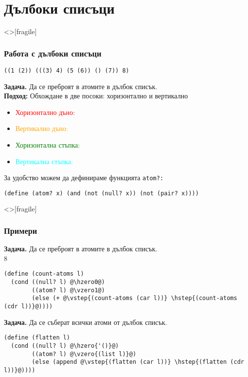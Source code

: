 \documentclass[alsotrans,beameroptions={aspectratio=169}]{beamerswitch}
\newcommand{\hzero}{\textcolor{red}}
\newcommand{\vzero}{\textcolor{orange}}
\newcommand{\hstep}{\textcolor{green}}
\newcommand{\vstep}{\textcolor{cyan}}
\begin{document}
\section{Дълбоки списъци}

\begin{frame}<>[fragile]
  \frametitle{Работа с дълбоки списъци}

\begin{verbatim}
((1 (2)) (((3) 4) (5 (6)) () (7)) 8)
\end{verbatim}
  \textbf{Задача.} Да се преброят в атомите в дълбок списък.\\
  \textbf{Подход:} Обхождане в две посоки: хоризонтално и вертикално
  \pause
  \begin{itemize}[<+->]
  \item \hzero{Хоризонтално дъно:} 
  \item \vzero{Вертикално дъно:} 
  \item \hstep{Хоризонтална стъпка:} 
  \item \vstep{Вертикална стъпка:} 
  \end{itemize}
  \vspace{2ex}
  \onslide<+->
  За удобство можем да дефинираме функцията \tt{atom?}:
\begin{lstlisting}
(define (atom? x) (and (not (null? x)) (not (pair? x))))
\end{lstlisting}
\end{frame}

\begin{frame}<>[fragile]
  \frametitle{Примери}
  \small
  \textbf{Задача.} Да се преброят в атомите в дълбок списък.\\
  8
  \pause
\begin{lstlisting}
(define (count-atoms l)
  (cond ((null? l) @\hzero0@)
        ((atom? l) @\vzero1@)
        (else (+ @\vstep{(count-atoms (car l))} \hstep{(count-atoms (cdr l))}@))))
\end{lstlisting}
\vspace{2ex}
  \pause
  \textbf{Задача.} Да се съберат всички атоми от дълбок списък.\\
  \pause
\begin{lstlisting}
(define (flatten l)
  (cond ((null? l) @\hzero{'()}@)
        ((atom? l) @\vzero{(list l)}@)
        (else (append @\vstep{(flatten (car l))} \hstep{(flatten (cdr l))}@))))
\end{lstlisting}
\end{frame}
\end{document}
